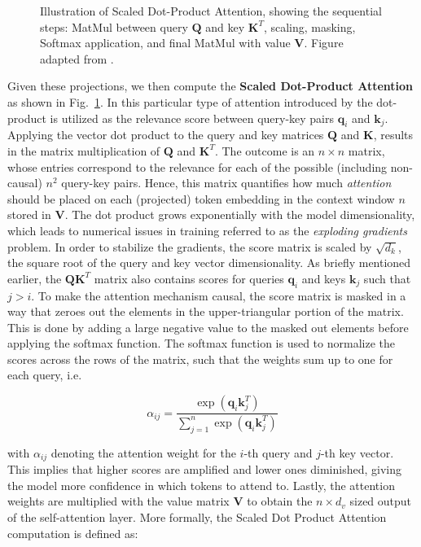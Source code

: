 \begin{figure}[htb]
    \centering
     
    \caption[Illustration of Scaled Dot-Product Attention]{Illustration of
    Scaled Dot-Product Attention, showing the sequential steps: MatMul between
    query $\bm{Q}$ and key $\bm{K}^T$, scaling, masking, Softmax application,
    and final MatMul with value $\bm{V}$. Figure adapted from
    \cite{vaswani2017attention}.}
    \label{fig:self_attention}
\end{figure}

Given these projections, we then compute the \textbf{Scaled Dot-Product
Attention} as shown in Fig.~\ref{fig:self_attention}. In this particular type of
attention introduced by \cite{vaswani2017attention} the dot-product is utilized
as the relevance score between query-key pairs $\bm{q}_i$ and $\bm{k}_j$.
Applying the vector dot product to the query and key matrices $\bm{Q}$ and
$\bm{K}$, results in the matrix multiplication of $\bm{Q}$ and $\bm{K}^T$. The
outcome is an $n \times n$ matrix, whose entries correspond to the relevance for
each of the possible (including non-causal) $n^2$ query-key pairs. Hence, this
matrix quantifies how much \textit{attention} should be placed on each
(projected) token embedding in the context window $n$ stored in $\bm{V}$. The
dot product grows exponentially with the model dimensionality, which leads to
numerical issues in training referred to as the \textit{exploding gradients}
\cite{pascanu2013difficulty} problem. In order to stabilize the gradients, the
score matrix is scaled by $\sqrt{d_k}$, the square root of the query and key
vector dimensionality. As briefly mentioned earlier, the $\bm{QK}^T$ matrix also
contains scores for queries $\bm{q}_i$ and keys $\bm{k}_j$ such that $j > i$. To
make the attention mechanism causal, the score matrix is masked in a way that
zeroes out the elements in the upper-triangular portion of the matrix. This is
done by adding a large negative value to the masked out elements before applying
the softmax function. The softmax function is used to normalize the scores
across the rows of the matrix, such that the weights sum up to one for each
query, i.e.

\begin{equation}
    \alpha_{ij} = \frac{\exp(\bm{q}_i \bm{k}_j^T)}{\sum_{j=1}^{n} \exp(\bm{q}_i \bm{k}_j^T)}
\end{equation}

with $\alpha_{ij}$ denoting the attention weight for the $i$-th query and $j$-th
key vector. This implies that higher scores are amplified and lower ones
diminished, giving the model more confidence in which tokens to attend to.
Lastly, the attention weights are multiplied with the value matrix $\bm{V}$ to
obtain the $n \times d_v$ sized output of the self-attention layer. More
formally, the Scaled Dot Product Attention computation is defined as:

